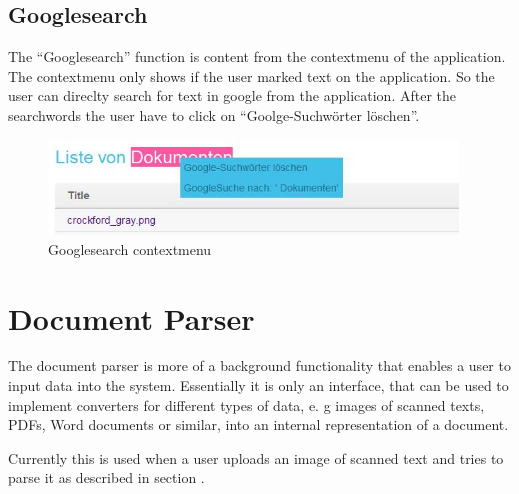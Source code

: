 \subsection{Googlesearch}

The \enquote{Googlesearch} function is content from the contextmenu of the application. The contextmenu only shows if 
the user marked text on the application. So the user can direclty search for text in google from the application. After 
the searchwords the user have to click on \enquote{Goolge-Suchwörter löschen}.

\begin{figure}[!ht]
  \centering
    \includegraphics[width=0.97\textwidth]{images/basic_functionalities/contextmenu.jpg}
  \caption{Googlesearch contextmenu}
  \label{fig:contextmenu}
\end{figure}

\section{Document Parser}

The document parser is more of a background functionality that enables a user to input data into the system. 
Essentially it is only an interface, that can be used to implement converters for different types of data, e. g images 
of scanned texts, PDFs, Word documents 
or similar, into an internal representation of a 
document.  

Currently this is used when a user uploads an image of scanned text and tries to parse it as described in section 
.

